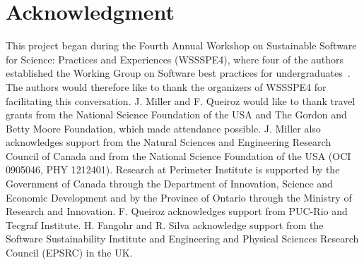 \documentclass[conference]{IEEEtran}
\begin{document}

%



\section*{Acknowledgment}

This project began during the Fourth Annual Workshop on Sustainable
Software for Science: Practices and Experiences (WSSSPE4), where four of the 
authors established the Working Group on Software best practices for 
undergraduates~\cite{WSSSPE4Report}. The authors would therefore like to thank the
organizers of WSSSPE4 for facilitating this conversation. J. Miller
and F. Queiroz would like to thank travel grants from the 
National Science Foundation of the USA and The  Gordon  and  Betty  Moore  
Foundation, which made attendance possible. J. Miller also acknowledges 
support from the Natural Sciences and Engineering Research Council of 
Canada and from the National Science Foundation of the USA (OCI 0905046, 
PHY 1212401). Research at Perimeter Institute is supported by the Government of
Canada through the Department of Innovation, Science and Economic
Development and by the Province of Ontario through the Ministry of
Research and Innovation. F. Queiroz acknowledges support from PUC-Rio and 
Tecgraf Institute.
H. Fangohr and R. Silva acknowledge support from the Software Sustainability Institute
and Engineering and Physical Sciences Research Council (EPSRC) in the UK.
\end{document}
